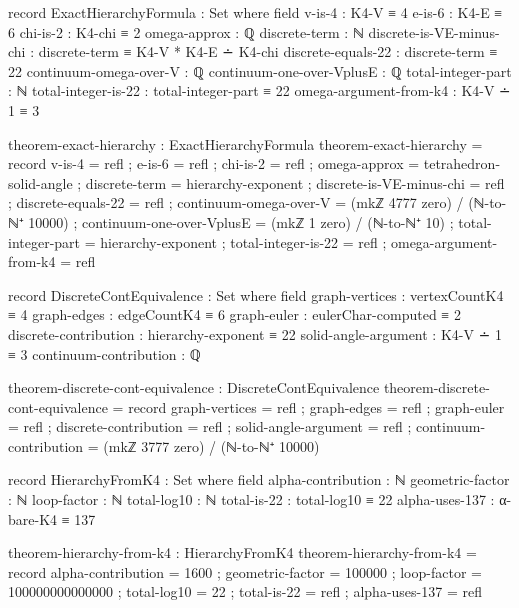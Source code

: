 \documentclass[11pt,a4paper]{book}
\begin{document}
\begin{code}
record ExactHierarchyFormula : Set where
  field
    v-is-4 : K4-V ≡ 4
    e-is-6 : K4-E ≡ 6
    chi-is-2 : K4-chi ≡ 2
    omega-approx : ℚ
    discrete-term : ℕ
    discrete-is-VE-minus-chi : discrete-term ≡ K4-V * K4-E ∸ K4-chi
    discrete-equals-22 : discrete-term ≡ 22
    continuum-omega-over-V : ℚ
    continuum-one-over-VplusE : ℚ
    total-integer-part : ℕ
    total-integer-is-22 : total-integer-part ≡ 22
    omega-argument-from-k4 : K4-V ∸ 1 ≡ 3

theorem-exact-hierarchy : ExactHierarchyFormula
theorem-exact-hierarchy = record
  { v-is-4 = refl
  ; e-is-6 = refl
  ; chi-is-2 = refl
  ; omega-approx = tetrahedron-solid-angle
  ; discrete-term = hierarchy-exponent
  ; discrete-is-VE-minus-chi = refl
  ; discrete-equals-22 = refl
  ; continuum-omega-over-V = (mkℤ 4777 zero) / (ℕ-to-ℕ⁺ 10000)
  ; continuum-one-over-VplusE = (mkℤ 1 zero) / (ℕ-to-ℕ⁺ 10)
  ; total-integer-part = hierarchy-exponent
  ; total-integer-is-22 = refl
  ; omega-argument-from-k4 = refl
  }
\end{code}

\begin{code}
record DiscreteContEquivalence : Set where
  field
    graph-vertices : vertexCountK4 ≡ 4
    graph-edges : edgeCountK4 ≡ 6
    graph-euler : eulerChar-computed ≡ 2
    discrete-contribution : hierarchy-exponent ≡ 22
    solid-angle-argument : K4-V ∸ 1 ≡ 3
    continuum-contribution : ℚ

theorem-discrete-cont-equivalence : DiscreteContEquivalence
theorem-discrete-cont-equivalence = record
  { graph-vertices = refl
  ; graph-edges = refl
  ; graph-euler = refl
  ; discrete-contribution = refl
  ; solid-angle-argument = refl
  ; continuum-contribution = (mkℤ 3777 zero) / (ℕ-to-ℕ⁺ 10000)
  }
\end{code}

\begin{code}
record HierarchyFromK4 : Set where
  field
    alpha-contribution : ℕ
    geometric-factor : ℕ
    loop-factor : ℕ
    total-log10 : ℕ
    total-is-22 : total-log10 ≡ 22
    alpha-uses-137 : α-bare-K4 ≡ 137

theorem-hierarchy-from-k4 : HierarchyFromK4
theorem-hierarchy-from-k4 = record
  { alpha-contribution = 1600
  ; geometric-factor = 100000
  ; loop-factor = 100000000000000
  ; total-log10 = 22
  ; total-is-22 = refl
  ; alpha-uses-137 = refl
  }
\end{code}
\end{document}
